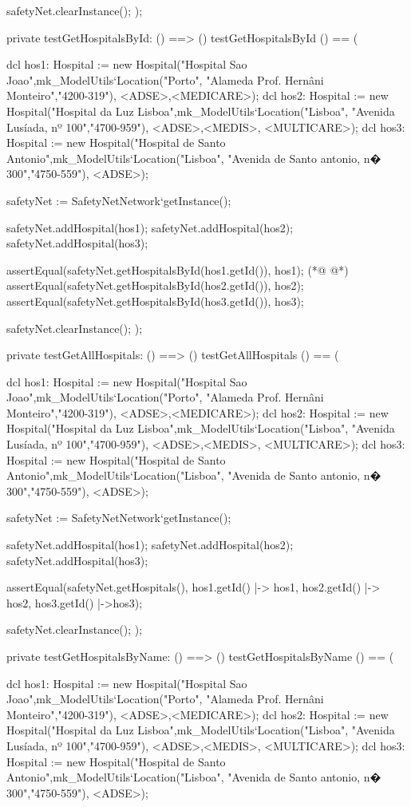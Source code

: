 \begin{vdmpp}[breaklines=true]
  safetyNet.clearInstance();
);

private testGetHospitalsById: () ==> ()
 testGetHospitalsById () == (
   
  dcl hos1: Hospital := new Hospital("Hospital Sao Joao",mk_ModelUtils`Location("Porto", "Alameda Prof. Hernâni Monteiro","4200-319"), {<ADSE>,<MEDICARE>});
  dcl hos2: Hospital := new Hospital("Hospital da Luz Lisboa",mk_ModelUtils`Location("Lisboa", "Avenida Lusíada, nº 100","4700-959"), {<ADSE>,<MEDIS>, <MULTICARE>});
  dcl hos3: Hospital := new Hospital("Hospital de Santo Antonio",mk_ModelUtils`Location("Lisboa", "Avenida de Santo antonio, n� 300","4750-559"), {<ADSE>});
  
  safetyNet := SafetyNetNetwork`getInstance();
   
  safetyNet.addHospital(hos1);
  safetyNet.addHospital(hos2);
  safetyNet.addHospital(hos3);
 
  assertEqual(safetyNet.getHospitalsById(hos1.getId()), hos1);
(*@
\label{testGetDoctorHospitals:413}
@*)
  assertEqual(safetyNet.getHospitalsById(hos2.getId()), hos2);
  assertEqual(safetyNet.getHospitalsById(hos3.getId()), hos3);
 
  safetyNet.clearInstance();
);

private testGetAllHospitals: () ==> ()
 testGetAllHospitals () == (
  
  dcl hos1: Hospital := new Hospital("Hospital Sao Joao",mk_ModelUtils`Location("Porto", "Alameda Prof. Hernâni Monteiro","4200-319"), {<ADSE>,<MEDICARE>});
  dcl hos2: Hospital := new Hospital("Hospital da Luz Lisboa",mk_ModelUtils`Location("Lisboa", "Avenida Lusíada, nº 100","4700-959"), {<ADSE>,<MEDIS>, <MULTICARE>});
  dcl hos3: Hospital := new Hospital("Hospital de Santo Antonio",mk_ModelUtils`Location("Lisboa", "Avenida de Santo antonio, n� 300","4750-559"), {<ADSE>});
  
  safetyNet := SafetyNetNetwork`getInstance();
   
  safetyNet.addHospital(hos1);
  safetyNet.addHospital(hos2);
  safetyNet.addHospital(hos3);
 
  assertEqual(safetyNet.getHospitals(), {hos1.getId() |-> hos1, hos2.getId() |-> hos2, hos3.getId() |->hos3});
 
  safetyNet.clearInstance();
);

private testGetHospitalsByName: () ==> ()
 testGetHospitalsByName () == (
  
  dcl hos1: Hospital := new Hospital("Hospital Sao Joao",mk_ModelUtils`Location("Porto", "Alameda Prof. Hernâni Monteiro","4200-319"), {<ADSE>,<MEDICARE>});
  dcl hos2: Hospital := new Hospital("Hospital da Luz Lisboa",mk_ModelUtils`Location("Lisboa", "Avenida Lusíada, nº 100","4700-959"), {<ADSE>,<MEDIS>, <MULTICARE>});
  dcl hos3: Hospital := new Hospital("Hospital de Santo Antonio",mk_ModelUtils`Location("Lisboa", "Avenida de Santo antonio, n� 300","4750-559"), {<ADSE>});
  

\end{vdmpp}
